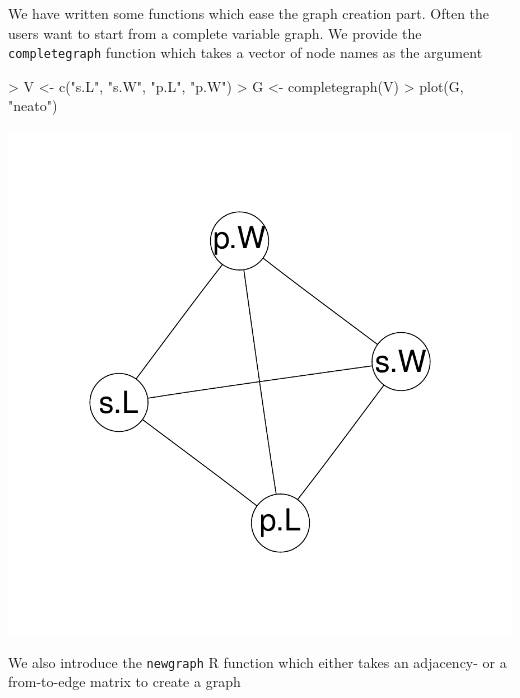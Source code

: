 \documentclass[12pt,oneside,titlepage,letter]{article}
\begin{document}
We have written some functions which ease the graph creation part. Often the users want to start from a complete variable graph. We provide the \texttt{completegraph} function which takes a vector of node names as the argument

\begin{center}
\begin{Schunk}
\begin{Sinput}
> V <- c("s.L", "s.W", "p.L", "p.W")
> G <- completegraph(V)
> plot(G, "neato")
\end{Sinput}
\end{Schunk}
\includegraphics{sweave_p-034}
\end{center}

We also introduce the \texttt{newgraph} R function which either takes an adjacency- or a from-to-edge matrix to create a graph
\end{document}

